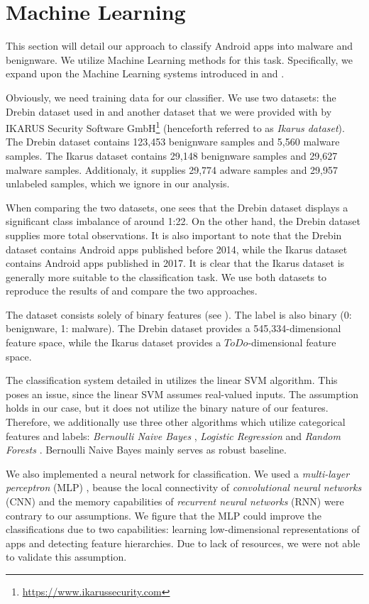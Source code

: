 \section{Machine Learning}
This section will detail our approach to classify Android apps into malware and benignware. We utilize Machine Learning methods for this task. Specifically, we expand upon the Machine Learning systems introduced in \cite{drebin} and \cite{7917369}.

Obviously, we need training data for our classifier. We use two datasets: the Drebin dataset used in \cite{drebin} and another dataset that we were provided with by IKARUS Security Software GmbH\footnote{\url{https://www.ikarussecurity.com}} (henceforth referred to as \emph{Ikarus dataset}). The Drebin dataset contains 123,453 benignware samples and 5,560 malware samples. The Ikarus dataset contains 29,148 benignware samples and 29,627 malware samples. Additionaly, it supplies 29,774 adware samples and 29,957 unlabeled samples, which we ignore in our analysis.

When comparing the two datasets, one sees that the Drebin dataset displays a significant class imbalance of around 1:22. On the other hand, the Drebin dataset supplies more total observations. It is also important to note that the Drebin dataset contains Android apps published before 2014, while the Ikarus dataset contains Android apps published in 2017. It is clear that the Ikarus dataset is generally more suitable to the classification task. We use both datasets to reproduce the results of \cite{drebin} and compare the two approaches.

The dataset consists solely of binary features (see ). The label is also binary (0: benignware, 1: malware). The Drebin dataset provides a 545,334-dimensional feature space, while the Ikarus dataset provides a $ToDo$-dimensional feature space.

The classification system detailed in \cite{drebin} utilizes the linear SVM algorithm. This poses an issue, since the linear SVM assumes real-valued inputs. The assumption holds in our case, but it does not utilize the binary nature of our features. Therefore, we additionally use three other algorithms which utilize categorical features and labels: \emph{Bernoulli Naive Bayes} \cite{Manning:2008:IIR:1394399}, \emph{Logistic Regression} \cite{10.2307/2983890} and \emph{Random Forests} \cite{598994}. Bernoulli Naive Bayes mainly serves as robust baseline.

We also implemented a neural network for classification. We used a \emph{multi-layer perceptron} (MLP) \cite{rosenblatt1958}, beause the local connectivity of \emph{convolutional neural networks} (CNN) \cite{Fukushima1980} and the memory capabilities of \emph{recurrent neural networks} (RNN) \cite{doi:10.1162/neco.1997.9.8.1735} were contrary to our assumptions. We figure that the MLP could improve the classifications due to two capabilities: learning low-dimensional representations of apps and detecting feature hierarchies. Due to lack of resources, we were not able to validate this assumption.